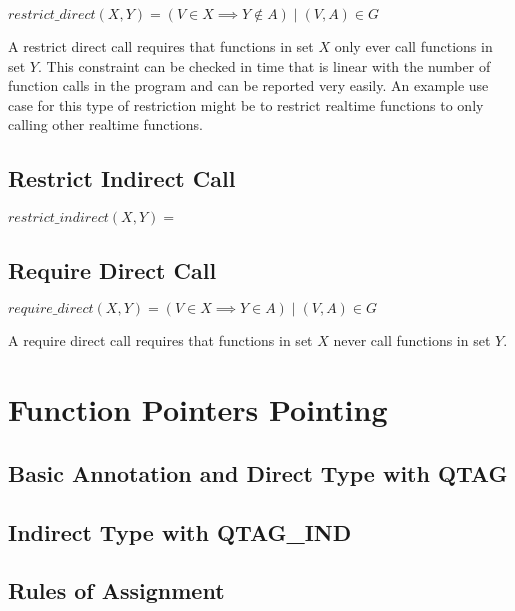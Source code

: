 \begin{center}
    $restrict\_direct(X, Y) = ( V \in X \implies Y \not \in A ) \mid (V, A) \in G$
\end{center}

A restrict direct call requires that functions in set $X$ only ever call functions in set $Y$.  This constraint can be checked in time that is linear with the number of function calls in the program and can be reported very easily.  An example use case for this type of restriction might be to restrict realtime functions to only calling other realtime functions.

\subsection{Restrict Indirect Call}

\begin{center}
    $restrict\_indirect(X, Y) = $
\end{center}

\subsection{Require Direct Call}

\begin{center}
    $require\_direct(X, Y) = ( V \in X \implies Y \in A ) \mid (V, A) \in G$
\end{center}

A require direct call requires that functions in set $X$ never call functions in set $Y$.  

\section{Function Pointers Pointing}

\subsection{Basic Annotation and Direct Type with QTAG}

\subsection{Indirect Type with QTAG\_IND}

\subsection{Rules of Assignment}

